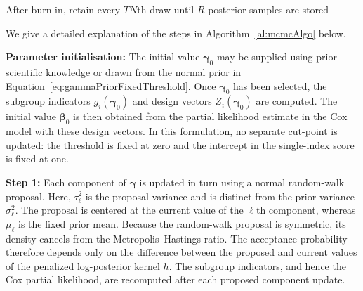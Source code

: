 \begin{algorithm}[p]
{    

    After burn-in, retain every $TN$th draw until $R$ posterior samples are
    stored\;
}

\caption{Metropolis--Hastings sampler for the fixed-threshold single-index
Cox model.}
\label{al:mcmcAlgo}
\end{algorithm}

We give a detailed explanation of the steps in
Algorithm~\ref{al:mcmcAlgo} below.

\textbf{Parameter initialisation:}
The initial value $\boldsymbol\gamma_0$ may be supplied using prior scientific
knowledge or drawn from the normal prior in
Equation~\ref{eq:gammaPriorFixedThreshold}. Once
$\boldsymbol\gamma_0$ has been selected, the subgroup indicators
$g_i(\boldsymbol\gamma_0)$ and design vectors
$Z_i(\boldsymbol\gamma_0)$ are computed. The initial value
$\boldsymbol\beta_0$ is then obtained from the partial likelihood estimate in
the Cox model with these design vectors. In this formulation, no separate
cut-point is updated: the threshold is fixed at zero and the intercept in the
single-index score is fixed at one.

\textbf{Step 1:}
Each component of $\boldsymbol\gamma$ is updated in turn using a normal
random-walk proposal. Here, $\tau_\ell^2$ is the proposal variance and is
distinct from the prior variance $\sigma_\ell^2$. The proposal is centered at
the current value of the $\ell$th component, whereas $\mu_\ell$ is the fixed
prior mean. Because the random-walk proposal is symmetric, its density cancels
from the Metropolis--Hastings ratio. The acceptance probability therefore
depends only on the difference between the proposed and current values of the
penalized log-posterior kernel $h$. The subgroup indicators, and hence the Cox
partial likelihood, are recomputed after each proposed component update.

